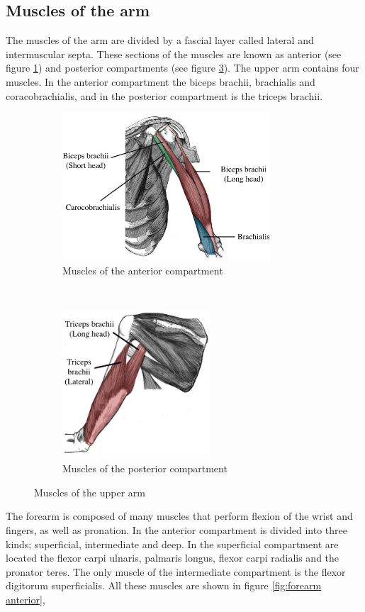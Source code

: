 \subsection{Muscles of the arm}
The muscles of the arm are divided by a fascial layer called lateral and intermuscular septa. These sections of the muscles are known as anterior (see figure \ref{fig:upper arm anterior}) and posterior compartments (see figure \ref{fig:upper arm posterior}). The upper arm contains four muscles. In the anterior compartment the biceps brachii, brachialis and coracobrachialis, and in the posterior compartment is the triceps brachii. 

\begin{figure}[!htpb]
	\begin{subfigure}[t]{0.52\textwidth}
		\centering
		\includegraphics[height=5.5cm,keepaspectratio]{figure15a}
		\caption{Muscles of the anterior compartment}
		\label{fig:upper arm anterior}
	\end{subfigure}
	~
	\begin{subfigure}[t]{0.44\textwidth}
		\centering
		\includegraphics[height=5.5cm,keepaspectratio]{figure15b}
		\caption{Muscles of the posterior compartment}
		\label{fig:upper arm posterior}
	\end{subfigure}
	\caption{Muscles of the upper arm}
\end{figure}

The forearm is composed of many muscles that perform flexion of the wrist and fingers, as well as pronation.  In the anterior compartment is divided into three kinds; superficial, intermediate and deep. In the superficial compartment are located the flexor carpi ulnaris, palmaris longus, flexor carpi radialis and the pronator teres. The only muscle of the intermediate compartment is the flexor digitorum superficialis. All these muscles are shown in figure \ref{fig:forearm anterior},

